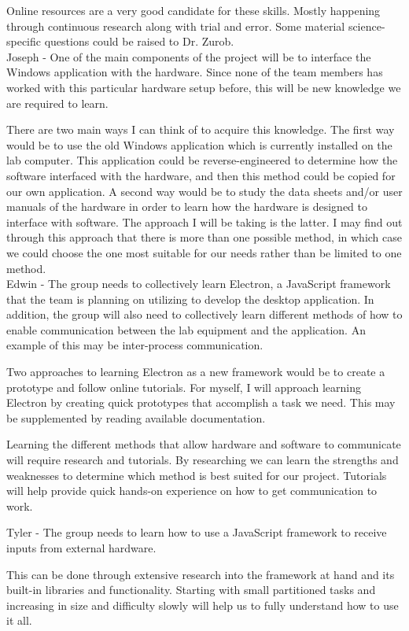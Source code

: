 \documentclass[12pt, titlepage]{article}
\begin{document}
Online resources are a very good candidate for these skills. Mostly happening through continuous research along with trial and error. Some material science-specific questions could be raised to Dr. Zurob.\\

Joseph - One of the main components of the project will be to interface the Windows application with the hardware. Since none of the team members has worked with this particular hardware setup before, this will be new knowledge we are required to learn.  

There are two main ways I can think of to acquire this knowledge. The first way would be to use the old Windows application which is currently installed on the lab computer. This application could be reverse-engineered to determine how the software interfaced with the hardware, and then this method could be copied for our own application. A second way would be to study the data sheets and/or user manuals of the hardware in order to learn how the hardware is designed to interface with software. The approach I will be taking is the latter. I may find out through this approach that there is more than one possible method, in which case we could choose the one most suitable for our needs rather than be limited to one method.\\ 

Edwin - The group needs to collectively learn Electron, a JavaScript framework that the team is planning on utilizing to develop the desktop application. In addition, the group will also need to collectively learn different methods of how to enable communication between the lab equipment and the application. An example of this may be inter-process communication.

Two approaches to learning Electron as a new framework would be to create a prototype and follow online tutorials. For myself, I will approach learning Electron by creating quick prototypes that accomplish a task we need. This may be supplemented by reading available documentation.

Learning the different methods that allow hardware and software to communicate will require research and tutorials. By researching we can learn the strengths and weaknesses to determine which method is best suited for our project. Tutorials will help provide quick hands-on experience on how to get communication to work.

Tyler - The group needs to learn how to use a JavaScript framework to receive inputs from external hardware. 

This can be done through extensive research into the framework at hand and its built-in libraries and functionality. Starting with small partitioned tasks and increasing in size and difficulty slowly will help us to fully understand how to use it all.
\end{document}

